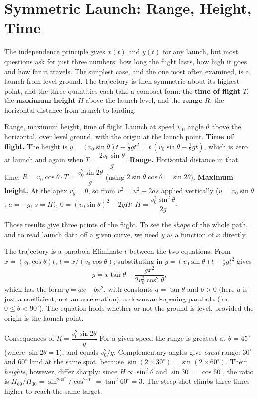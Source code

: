\section{Symmetric Launch: Range, Height, Time}

The independence principle gives $x(t)$ and $y(t)$ for any launch, but most questions ask for just
three numbers: how long the flight lasts, how high it goes and how far it travels. The simplest case,
and the one most often examined, is a launch from level ground. The trajectory is then
symmetric about its highest point, and the three quantities each take a compact form: the
\textbf{time of flight} $T$, the \textbf{maximum height} $H$ above the launch level, and the
\textbf{range} $R$, the horizontal distance from launch to landing.

\begin{derivbox}{Range, maximum height, time of flight}
Launch at speed $v_0$, angle $\theta$ above the horizontal, over level ground, with the origin at the
launch point.
 \textbf{Time of flight.} The height is $y=(v_0\sin\theta)t-\tfrac12gt^2=t\,(v_0\sin\theta-\tfrac12gt)$,
which is zero at launch and again when $T=\dfrac{2v_0\sin\theta}{g}$.
 \textbf{Range.} Horizontal distance in that time:
$R=v_0\cos\theta\cdot T=\dfrac{v_0^2\sin2\theta}{g}$ (using $2\sin\theta\cos\theta=\sin2\theta$).
 \textbf{Maximum height.} At the apex $v_y=0$, so from $v^2=u^2+2as$ applied vertically
($u=v_0\sin\theta$, $a=-g$, $s=H$), $0=(v_0\sin\theta)^2-2gH$:
$H=\dfrac{v_0^2\sin^2\theta}{2g}$.
\end{derivbox}

Those results give three points of the flight. To see the \emph{shape} of the whole path, and to read
launch data off a given curve, we need $y$ as a function of $x$ directly.

\begin{derivbox}{The trajectory is a parabola}
Eliminate $t$ between the two equations. From $x=(v_0\cos\theta)t$, $t=x/(v_0\cos\theta)$; substituting
in $y=(v_0\sin\theta)t-\tfrac12gt^2$ gives
\[
y=x\tan\theta-\frac{g x^2}{2v_0^2\cos^2\theta},
\]
which has the form $y=ax-bx^2$, with constants $a=\tan\theta$ and $b>0$ (here $a$ is just a
coefficient, not an acceleration): a downward-opening parabola (for $0\le\theta<90^\circ$). The
equation holds whether or not the ground is level, provided the origin is the launch point.
\end{derivbox}

\begin{keybox}{Consequences of $R=\dfrac{v_0^2\sin2\theta}{g}$}
For a given speed the range is greatest at $\theta=45^\circ$ (where $\sin2\theta=1$), and equals $v_0^2/g$.
Complementary angles give \emph{equal} range: $30^\circ$ and $60^\circ$ land at the same spot, because
$\sin(2\times30^\circ)=\sin(2\times60^\circ)$. Their \emph{heights}, however, differ sharply: since
$H\propto\sin^2\theta$ and $\sin30^\circ=\cos60^\circ$, the ratio is
$H_{60}/H_{30}=\sin^260^\circ/\cos^260^\circ=\tan^2 60^\circ=3$. The steep shot climbs three
times higher to reach the same target.
\end{keybox}

